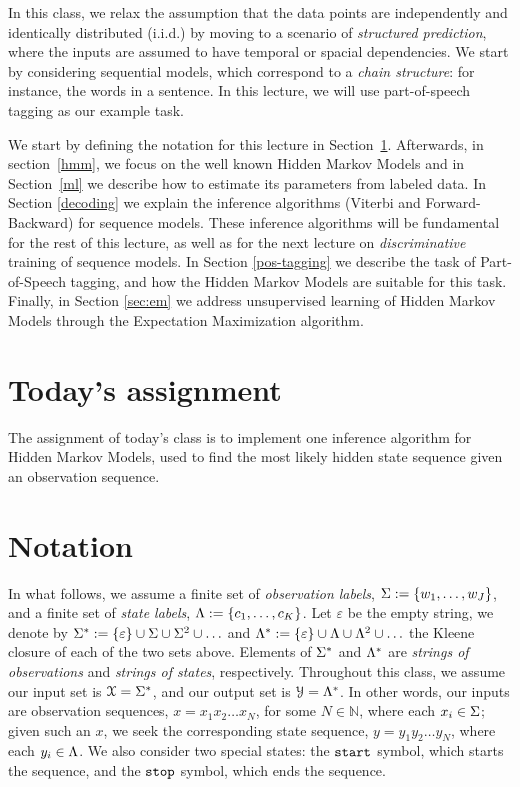 

In this class, we relax the assumption that
the data points are independently and identically distributed (i.i.d.) 
by moving to a scenario of \emph{structured prediction}, where the inputs are assumed to have
temporal or spacial dependencies. We start by 
considering sequential models, which correspond to a \emph{chain structure}: for instance,
the words in a sentence. In this lecture, we will use part-of-speech
tagging as our example task.  

We start by defining the notation for this lecture in Section~\ref{notation}.
Afterwards, in section~\ref{hmm}, we focus on the well known Hidden Markov Models and in Section~\ref{ml} we describe how to estimate its parameters from labeled data. In Section \ref{decoding} we explain the inference
algorithms (Viterbi and Forward-Backward) for sequence models. These
inference algorithms will be fundamental for the rest of this lecture,
as well as for the next lecture on \emph{discriminative} training of sequence
models. In Section \ref{pos-tagging} we describe the task of 
Part-of-Speech tagging, and how the Hidden Markov Models are suitable for this task. 
Finally, in Section \ref{sec:em} we 
address unsupervised learning of Hidden Markov Models through the Expectation Maximization
algorithm.

\section*{Today's assignment}

The assignment of today's class is to implement one inference algorithm for Hidden Markov Models, used to find the most likely hidden state sequence given an observation sequence.

\section{Notation}\label{notation}

In what follows, 
we assume a finite set of \emph{observation labels}, 
$\Sigma := \{w_1,\ldots,w_J\}$,
and a finite set of \emph{state labels}, 
$\Lambda := \{c_1,\ldots, c_K\}$.
Let $\varepsilon$ be the empty string, 
we denote by 
$\Sigma^* := \{\varepsilon\} \cup \Sigma \cup \Sigma^2 \cup \ldots$ and 
$\Lambda^* := \{\varepsilon\} \cup \Lambda \cup \Lambda^2  \cup \ldots$ the Kleene closure 
of each of the two sets above. 
Elements of $\Sigma^*$ and $\Lambda^*$ 
are \emph{strings of observations} and \emph{strings of states}, 
respectively. 
Throughout this class, we 
assume our input set is $\mathcal{X} = \Sigma^*$, 
and our output set is $\mathcal{Y} = \Lambda^*$. 
In other words, 
our inputs are observation sequences, 
$x = x_1 x_2 \ldots x_N$, 
for some $N \in \mathbb{N}$, where each $x_i \in \Sigma$;
given such an $x$, we seek 
the corresponding state sequence, 
$y = y_1 y_2 \ldots y_N$, 
where each $y_i \in \Lambda$. We also consider two special states: the ${\tt start}$ symbol,
which starts the sequence, and 
the ${\tt stop}$ symbol, which ends the sequence. 

